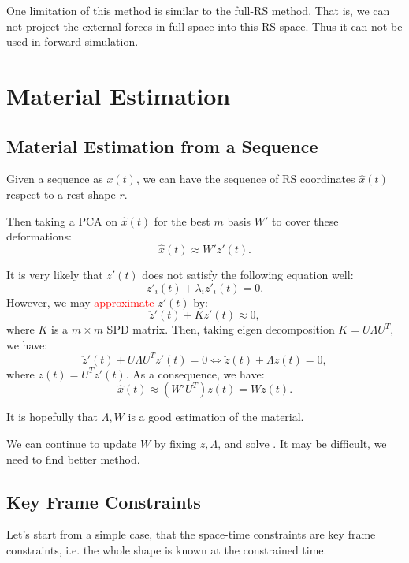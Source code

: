 \documentclass[9pt,twocolumn]{extarticle}
\newcommand{\TODO}[1]{\textcolor{red}{#1}}
\begin{document}
One limitation of this method is similar to the full-RS method. That is, we can
not project the external forces in full space into this RS space. Thus it can
not be used in forward simulation.

\section{Material Estimation}\label{sec:mat-est}
\subsection{Material Estimation from a Sequence}
Given a sequence as $x(t)$, we can have the sequence of RS coordinates
$\hat{x}(t)$ respect to a rest shape $r$.

Then taking a PCA on $\hat{x}(t)$ for the best $m$ basis $W'$ to cover
these deformations:
\begin{equation}
  \hat{x}(t) \approx W'z'(t).
\end{equation}

It is very likely that $z'(t)$ does not satisfy the following equation
well:
\begin{equation}
  \ddot{z}'_i(t) + \lambda_i z'_i(t) = 0.
\end{equation}
However, we may \TODO{approximate} $z'(t)$ by:
\begin{equation}
  \ddot{z}'(t) + K z'(t) \approx 0,
\end{equation}
where $K$ is a $m \times m$ SPD matrix.  Then, taking eigen
decomposition $K=U\Lambda U^T$, we have:
\begin{equation}
  \ddot{z}'(t) + U\Lambda U^T z'(t) = 0 \Leftrightarrow \ddot{z}(t) + \Lambda z(t) = 0,
\end{equation}
where $z(t)=U^Tz'(t)$.  As a consequence, we have:
\begin{equation}
  \hat{x}(t) \approx (W'U^T) z(t) = W z(t).
\end{equation}

It is hopefully that $\Lambda, W$ is a good estimation of the material.

We can continue to update $W$ by fixing $z, \Lambda$, and solve
.  It may be difficult, we need to find better
method.

\subsection{Key Frame Constraints}
Let's start from a simple case, that the space-time constraints are
key frame constraints, i.e. the whole shape is known at the
constrained time.
\end{document}
